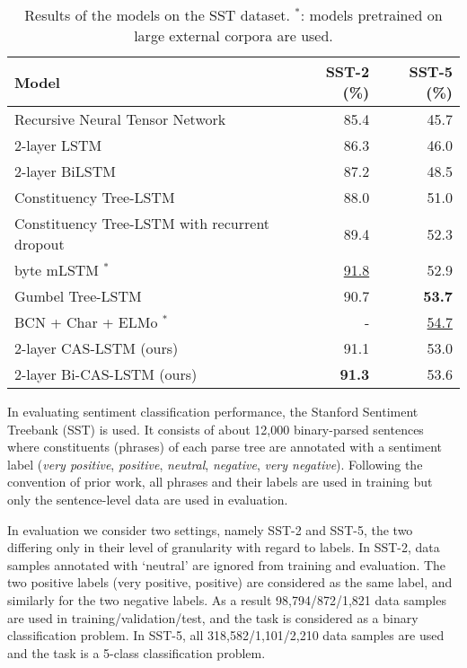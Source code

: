 \documentclass[wcp]{jmlr}
\begin{document}
    \begin{table*}[t]
        \centering
        \begin{tabular}{l r r}
            \hline
            \bf{Model} & \bf{SST-2 (\%)} & \bf{SST-5 (\%)} \\
            \hline
            Recursive Neural Tensor Network \citep{socher2013recursive} & 85.4 & 45.7 \\
            2-layer LSTM \citep{tai2015treelstm} & 86.3 & 46.0 \\
            2-layer BiLSTM \citep{tai2015treelstm} & 87.2 & 48.5 \\
            Constituency Tree-LSTM \citep{tai2015treelstm} & 88.0 & 51.0 \\
            Constituency Tree-LSTM with recurrent dropout \citep{looks2017deep} & 89.4 & 52.3 \\
            byte mLSTM \citep{radford2017learning}$^\ast$ & \underline{91.8} & 52.9 \\
            Gumbel Tree-LSTM \citep{choi2018learning} & 90.7 & \bf{53.7} \\
            BCN + Char + ELMo \citep{peters2018elmo}$^\ast$ & - & \underline{54.7} \\
            \hline
            2-layer CAS-LSTM (ours) & 91.1 & 53.0	 \\
            2-layer Bi-CAS-LSTM (ours) & \bf{91.3} & 53.6 \\
            \hline
        \end{tabular}
        \caption{Results of the models on the SST dataset. $^\ast$: models pretrained on large external corpora are used.}
        \label{table:sst}
    \end{table*}
    
    In evaluating sentiment classification performance, the Stanford Sentiment Treebank (SST) \citep{socher2013recursive} is used.
    It consists of about 12,000 binary-parsed sentences where constituents (phrases) of each parse tree are annotated with a sentiment label (\textit{very positive}, \textit{positive}, \textit{neutral}, \textit{negative}, \textit{very negative}).
    Following the convention of prior work, all phrases and their labels are used in training but only the sentence-level data are used in evaluation.
    
    In evaluation we consider two settings, namely SST-2 and SST-5, the two differing only in their level of granularity with regard to labels.
    In SST-2, data samples annotated with `neutral' are ignored from training and evaluation.
    The two positive labels (very positive, positive) are considered as the same label, and similarly for the two negative labels.
    As a result 98,794/872/1,821 data samples are used in training/validation/test, and the task is considered as a binary classification problem.
    In SST-5, all 318,582/1,101/2,210 data samples are used and the task is a 5-class classification problem.
    
\end{document}
